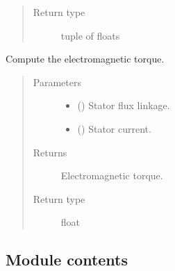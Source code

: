 \documentclass[letterpaper,10pt,english]{sphinxmanual}
\begin{document}
\begin{fulllineitems}
\begin{fulllineitems}
\begin{quote}
\begin{description}
\item[{Return type}] \leavevmode
{}\sphinxhyphen{}tuple of floats

\end{description}\end{quote}

\end{fulllineitems}


\begin{fulllineitems}
\label{\detokenize{model:model.sm_drive.Motor.torque}}
\pysigstartsignatures
{}
\pysigstopsignatures
\sphinxAtStartPar
Compute the electromagnetic torque.
\begin{quote}\begin{description}
\item[{Parameters}] \leavevmode\begin{itemize}
\item {} 
\sphinxAtStartPar
{} () \textendash{} Stator flux linkage.

\item {} 
\sphinxAtStartPar
{} () \textendash{} Stator current.

\end{itemize}

\item[{Returns}] \leavevmode
\sphinxAtStartPar
{} \textendash{} Electromagnetic torque.

\item[{Return type}] \leavevmode
\sphinxAtStartPar
float

\end{description}\end{quote}

\end{fulllineitems}


\end{fulllineitems}



\subsection{Module contents}
\label{\detokenize{model:module-model}}\label{\detokenize{model:module-contents}}
\sphinxstepscope
\end{document}
